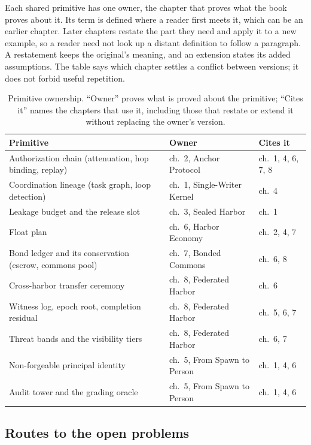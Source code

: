Each shared primitive has one owner, the chapter that proves what the book
proves about it. Its term is defined where a reader first meets it, which can
be an earlier chapter. Later chapters restate the part they need
and apply it to a new example, so a reader need not look up a distant
definition to follow a paragraph. A
restatement keeps the original's meaning, and an extension states its added
assumptions. The table says which chapter settles a conflict between
versions; it does not forbid useful repetition.

\begin{table}[H]
\centering
\caption{Primitive ownership. ``Owner'' proves what is proved about the
primitive; ``Cites it'' names the chapters that use it, including those that
restate or extend it without replacing the owner's version.}
\label{tab:primitive-ownership}
\small
\begin{tabularx}{\textwidth}{@{}>{\raggedright\arraybackslash}X >{\raggedright\arraybackslash}p{} >{\raggedright\arraybackslash}p{}@{}}
\toprule
\textbf{Primitive} & \textbf{Owner} & \textbf{Cites it} \\
\midrule
Authorization chain (attenuation, hop binding, replay) & ch.~2, Anchor Protocol & ch.~1, 4, 6, 7, 8 \\
Coordination lineage (task graph, loop detection) & ch.~1, Single-Writer Kernel & ch.~4 \\
Leakage budget and the release slot & ch.~3, Sealed Harbor & ch.~1 \\
Float plan & ch.~6, Harbor Economy & ch.~2, 4, 7 \\
Bond ledger and its conservation (escrow, commons pool) & ch.~7, Bonded Commons & ch.~6, 8 \\
Cross-harbor transfer ceremony & ch.~8, Federated Harbor & ch.~6 \\
Witness log, epoch root, completion residual & ch.~8, Federated Harbor & ch.~5, 6, 7 \\
Threat bands and the visibility tiers & ch.~8, Federated Harbor & ch.~6, 7 \\
Non-forgeable principal identity & ch.~5, From Spawn to Person & ch.~1, 4, 6 \\
Audit tower and the grading oracle & ch.~5, From Spawn to Person & ch.~1, 4, 6 \\
\bottomrule
\end{tabularx}
\end{table}

\subsection*{Routes to the open problems}
\label{app:open-concordance}


